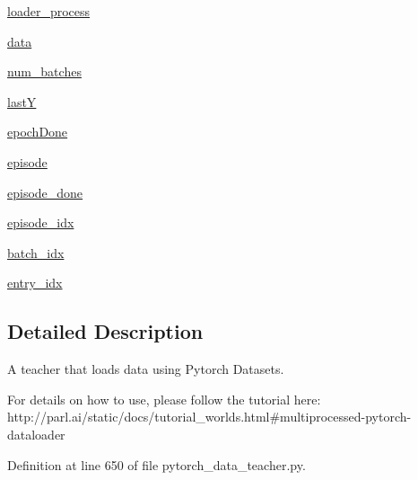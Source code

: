 \begin{DoxyCompactItemize}
\hyperlink{classparlai_1_1core_1_1pytorch__data__teacher_1_1PytorchDataTeacher_a7d0c50251b2e88746aa6a6ff4a454ca8}{loader\+\_\+process}
\item 
\hyperlink{classparlai_1_1core_1_1pytorch__data__teacher_1_1PytorchDataTeacher_afc57c27e502b27aff86630e7d9768700}{data}
\item 
\hyperlink{classparlai_1_1core_1_1pytorch__data__teacher_1_1PytorchDataTeacher_abaa8cbd02f036fb06d9e5290d331bb40}{num\+\_\+batches}
\item 
\hyperlink{classparlai_1_1core_1_1pytorch__data__teacher_1_1PytorchDataTeacher_a452bb226c67e6c4002679fa293433e27}{lastY}
\item 
\hyperlink{classparlai_1_1core_1_1pytorch__data__teacher_1_1PytorchDataTeacher_ad39ab22ed0829965a4e418ccda1f5b51}{epoch\+Done}
\item 
\hyperlink{classparlai_1_1core_1_1pytorch__data__teacher_1_1PytorchDataTeacher_a65bef2570fe8e94a2077fc30240e4524}{episode}
\item 
\hyperlink{classparlai_1_1core_1_1pytorch__data__teacher_1_1PytorchDataTeacher_a7b3026e037904f2e92282729dc53bd13}{episode\+\_\+done}
\item 
\hyperlink{classparlai_1_1core_1_1pytorch__data__teacher_1_1PytorchDataTeacher_a096cd29f1b94d0fb626505907280494e}{episode\+\_\+idx}
\item 
\hyperlink{classparlai_1_1core_1_1pytorch__data__teacher_1_1PytorchDataTeacher_af2d84c6c04e53cc119de23ad07efbbe3}{batch\+\_\+idx}
\item 
\hyperlink{classparlai_1_1core_1_1pytorch__data__teacher_1_1PytorchDataTeacher_ab0e45ca1923e9b99747c117dfbaa95f3}{entry\+\_\+idx}
\end{DoxyCompactItemize}


\subsection{Detailed Description}
\begin{DoxyVerb}A teacher that loads data using Pytorch Datasets.

For details on how to use, please follow the tutorial here:
http://parl.ai/static/docs/tutorial_worlds.html#multiprocessed-pytorch-dataloader
\end{DoxyVerb}
 

Definition at line 650 of file pytorch\+\_\+data\+\_\+teacher.\+py.



